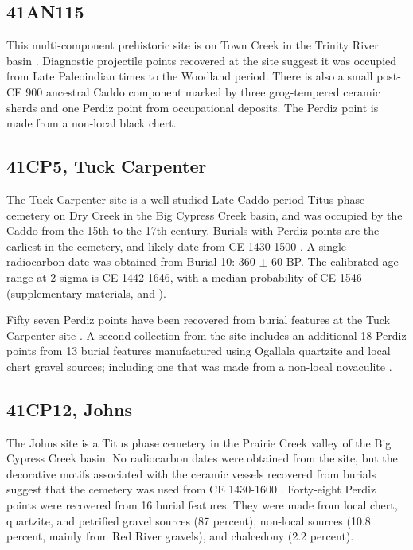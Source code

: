 \documentclass[review]{elsarticle}
\begin{document}
\subsection*{41AN115}

This multi-component prehistoric site is on Town Creek in the Trinity River basin \citep{RN8982}. Diagnostic projectile points recovered at the site suggest it was occupied from Late Paleoindian times to the Woodland period. There is also a small post-CE 900 ancestral Caddo component marked by three grog-tempered ceramic sherds and one Perdiz point from occupational deposits. The Perdiz point is made from a non-local black chert.

\subsection*{41CP5, Tuck Carpenter}

The Tuck Carpenter site is a well-studied Late Caddo period Titus phase cemetery on Dry Creek in the Big Cypress Creek basin, and was occupied by the Caddo from the 15th to the 17th century. Burials with Perdiz points are the earliest in the cemetery, and likely date from CE 1430-1500 \citep[197]{RN8962}. A single radiocarbon date was obtained from Burial 10: 360 $\pm$ 60 BP. The calibrated age range at 2 sigma is CE 1442-1646, with a median probability of CE 1546 (supplementary materials, and \citet{RN8980}).

Fifty seven Perdiz points have been recovered from burial features at the Tuck Carpenter site \citep{RN8963,RN3158,RN3159}. A second collection from the site includes an additional 18 Perdiz points from 13 burial features manufactured using Ogallala quartzite and local chert gravel sources; including one that was made from a non-local novaculite \citep[Table 2]{RN8962}.

\subsection*{41CP12, Johns}

The Johns site is a Titus phase cemetery in the Prairie Creek valley of the Big Cypress Creek basin. No radiocarbon dates were obtained from the site, but the decorative motifs associated with the ceramic vessels recovered from burials suggest that the cemetery was used from CE 1430-1600 \citep{RN2440}. Forty-eight Perdiz points were recovered from 16 burial features. They were made from local chert, quartzite, and petrified gravel sources (87 percent), non-local sources (10.8 percent, mainly from Red River gravels), and chalcedony (2.2 percent).
\end{document}
